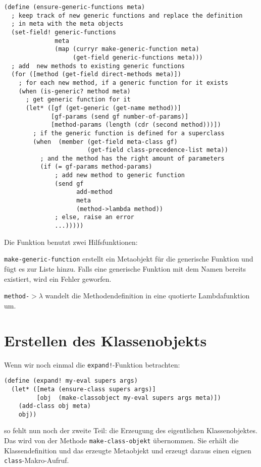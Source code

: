 \begin{lstlisting}
(define (ensure-generic-functions meta)
  ; keep track of new generic functions and replace the definition
  ; in meta with the meta objects
  (set-field! generic-functions
              meta
              (map (curryr make-generic-function meta)
                   (get-field generic-functions meta)))
  ; add  new methods to existing generic functions
  (for ([method (get-field direct-methods meta)])
    ; for each new method, if a generic function for it exists
    (when (is-generic? method meta)
      ; get generic function for it
      (let* ([gf (get-generic (get-name method))]
             [gf-params (send gf number-of-params)]
             [method-params (length (cdr (second method)))])
        ; if the generic function is defined for a superclass
        (when  (member (get-field meta-class gf)
                       (get-field class-precedence-list meta))
          ; and the method has the right amount of parameters
          (if (= gf-params method-params)
              ; add new method to generic function
              (send gf
                    add-method
                    meta
                    (method->lambda method))
              ; else, raise an error
              ...)))))
\end{lstlisting}

Die Funktion benutzt zwei Hilfsfunktionen:

\texttt{make-generic-function} erstellt ein Metaobjekt für die generische Funktion und fügt es zur Liste hinzu. Falls eine generische Funktion mit dem Namen bereits existiert, wird ein Fehler geworfen.

\texttt{method-$>\lambda$} wandelt die Methodendefinition in eine quotierte Lambdafunktion um.

\section{Erstellen des Klassenobjekts}

Wenn wir noch einmal die \texttt{expand!}-Funktion betrachten:

\begin{lstlisting}
(define (expand! my-eval supers args)
  (let* ([meta (ensure-class supers args)]
         [obj  (make-classobject my-eval supers args meta)])
    (add-class obj meta)
    obj))
\end{lstlisting}

so fehlt nun noch der zweite Teil: die Erzeugung des eigentlichen Klassenobjektes. Das wird von der Methode \texttt{make-class-objekt} übernommen. Sie erhält die Klassendefinition und das erzeugte Metaobjekt und erzeugt daraus einen eignen \texttt{class}-Makro-Aufruf.


